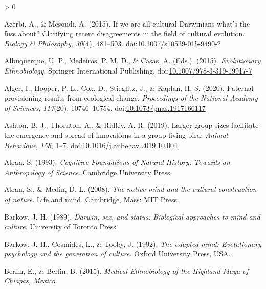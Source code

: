 \documentclass[
  11pt,
]{article}
\newlength{\cslhangindent}
\newenvironment{CSLReferences}[2] %
 {%
  \setlength{\parindent}{0pt}
  \ifodd #1 \everypar{\setlength{\hangindent}{\cslhangindent}}\ignorespaces\fi
  \ifnum #2 > 0
  \setlength{\parskip}{#2\baselineskip}
  \fi
 }%
 {}
\begin{document}
\hypertarget{refs}{}
\begin{CSLReferences}{1}{0}
\leavevmode\hypertarget{ref-acerbiIfWeAre2015}{}%
Acerbi, A., \& Mesoudi, A. (2015). If we are all cultural {Darwinians} what's the fuss about? {Clarifying} recent disagreements in the field of cultural evolution. \emph{Biology \& Philosophy}, \emph{30}(4), 481--503. doi:\href{https://doi.org/10.1007/s10539-015-9490-2}{10.1007/s10539-015-9490-2}

\leavevmode\hypertarget{ref-albuquerqueEvolutionaryEthnobiology2015}{}%
Albuquerque, U. P., Medeiros, P. M. D., \& Casas, A. (Eds.). (2015). \emph{Evolutionary {Ethnobiology}}. {Springer International Publishing}. doi:\href{https://doi.org/10.1007/978-3-319-19917-7}{10.1007/978-3-319-19917-7}

\leavevmode\hypertarget{ref-algerPaternalProvisioningResults2020}{}%
Alger, I., Hooper, P. L., Cox, D., Stieglitz, J., \& Kaplan, H. S. (2020). Paternal provisioning results from ecological change. \emph{Proceedings of the National Academy of Sciences}, \emph{117}(20), 10746--10754. doi:\href{https://doi.org/10.1073/pnas.1917166117}{10.1073/pnas.1917166117}

\leavevmode\hypertarget{ref-ashtonLargerGroupSizes2019}{}%
Ashton, B. J., Thornton, A., \& Ridley, A. R. (2019). Larger group sizes facilitate the emergence and spread of innovations in a group-living bird. \emph{Animal Behaviour}, \emph{158}, 1--7. doi:\href{https://doi.org/10.1016/j.anbehav.2019.10.004}{10.1016/j.anbehav.2019.10.004}

\leavevmode\hypertarget{ref-atranCognitiveFoundationsNatural1993}{}%
Atran, S. (1993). \emph{Cognitive {Foundations} of {Natural History}: {Towards} an {Anthropology} of {Science}}. {Cambridge University Press}.

\leavevmode\hypertarget{ref-atranNativeMindCultural2008}{}%
Atran, S., \& Medin, D. L. (2008). \emph{The native mind and the cultural construction of nature}. Life and mind. {Cambridge, Mass}: {MIT Press}.

\leavevmode\hypertarget{ref-barkowDarwinSexStatus1989}{}%
Barkow, J. H. (1989). \emph{Darwin, sex, and status: {Biological} approaches to mind and culture.} {University of Toronto Press}.

\leavevmode\hypertarget{ref-barkowAdaptedMindEvolutionary1992}{}%
Barkow, J. H., Cosmides, L., \& Tooby, J. (1992). \emph{The adapted mind: {Evolutionary} psychology and the generation of culture}. {Oxford University Press, USA}.

\leavevmode\hypertarget{ref-berlinMedicalEthnobiologyHighland2015}{}%
Berlin, E., \& Berlin, B. (2015). \emph{Medical {Ethnobiology} of the {Highland Maya} of {Chiapas}, {Mexico}}.


\end{CSLReferences}
\end{document}
